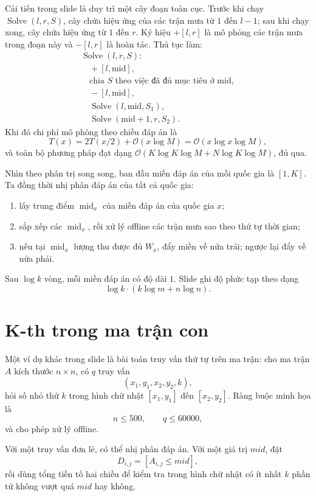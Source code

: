 \documentclass[11pt]{article}
\newcommand{\Oh}{\mathcal{O}}
\newcommand{\midp}{\mathrm{mid}}
\newcommand{\Solve}{\operatorname{Solve}}
\begin{document}
Cải tiến trong slide là duy trì một cây đoạn toàn cục. Trước khi chạy
\(\Solve(l,r,S)\), cây chứa hiệu ứng của các trận mưa từ \(1\) đến \(l-1\);
sau khi chạy xong, cây chứa hiệu ứng từ \(1\) đến \(r\). Ký hiệu
\(+[l,r]\) là mô phỏng các trận mưa trong đoạn này và \(-[l,r]\) là hoàn tác.
Thủ tục làm:
\[
\begin{array}{l}
\Solve(l,r,S):\\
\quad +[l,\midp],\\
\quad \text{chia }S\text{ theo việc đã đủ mục tiêu ở }\midp,\\
\quad -[l,\midp],\\
\quad \Solve(l,\midp,S_1),\\
\quad \Solve(\midp+1,r,S_2).
\end{array}
\]
Khi đó chi phí mô phỏng theo chiều đáp án là
\[
  T(x)=2T(x/2)+\Oh(x\log M)=\Oh(x\log x\log M),
\]
và toàn bộ phương pháp đạt dạng \(\Oh(K\log K\log M+N\log K\log M)\), đủ qua.

Nhìn theo phân trị song song, ban đầu miền đáp án của mỗi quốc gia là
\([1,K]\). Ta đồng thời nhị phân đáp án của tất cả quốc gia:
\begin{enumerate}
  \item lấy trung điểm \(\operatorname{mid}_x\) của miền đáp án của quốc gia
  \(x\);
  \item sắp xếp các \(\operatorname{mid}_x\), rồi xử lý offline các trận mưa
  sao theo thứ tự thời gian;
  \item nếu tại \(\operatorname{mid}_x\) lượng thu được đủ \(W_x\), đẩy miền
  về nửa trái; ngược lại đẩy về nửa phải.
\end{enumerate}
Sau \(\log k\) vòng, mỗi miền đáp án có độ dài \(1\). Slide ghi độ phức tạp
theo dạng
\[
  \log k\cdot(k\log m+n\log n).
\]

\section{K-th trong ma trận con}

Một ví dụ khác trong slide là bài toán truy vấn thứ tự trên ma trận:
cho ma trận \(A\) kích thước \(n\times n\), có \(q\) truy vấn
\[
  (x_1,y_1,x_2,y_2,k),
\]
hỏi số nhỏ thứ \(k\) trong hình chữ nhật
\([x_1,y_1]\) đến \([x_2,y_2]\). Ràng buộc minh họa là
\[
  n\le 500,\qquad q\le 60000,
\]
và cho phép xử lý offline.

Với một truy vấn đơn lẻ, có thể nhị phân đáp án. Với một giá trị
\(\mathit{mid}\), đặt
\[
  D_{i,j}=[A_{i,j}\le \mathit{mid}],
\]
rồi dùng tổng tiền tố hai chiều để kiểm tra trong hình chữ nhật có ít nhất
\(k\) phần tử không vượt quá \(\mathit{mid}\) hay không.
\end{document}
